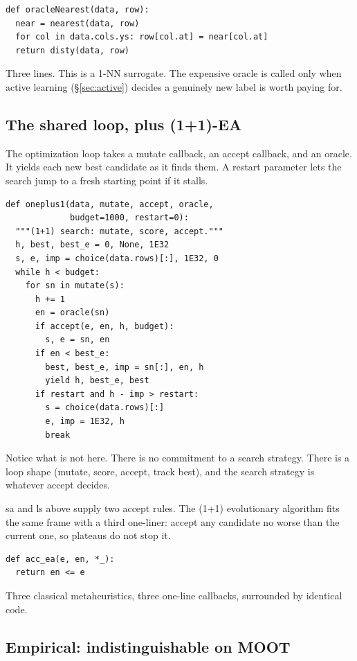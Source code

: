 \begin{verbatim}
def oracleNearest(data, row): 
  near = nearest(data, row)
  for col in data.cols.ys: row[col.at] = near[col.at]
  return disty(data, row)
\end{verbatim}

Three lines. This is a 1-NN surrogate. The expensive oracle is called
only when active learning (\S\ref{sec:active}) decides a genuinely
new label is worth paying for.

\subsection{The shared loop, plus (1+1)-EA}

The optimization loop takes a mutate callback, an accept callback,
and an oracle. It yields each new best candidate as it finds them. A
\textsf{restart} parameter lets the search jump to a fresh starting
point if it stalls.

\begin{verbatim}
def oneplus1(data, mutate, accept, oracle,
             budget=1000, restart=0):
  """(1+1) search: mutate, score, accept."""
  h, best, best_e = 0, None, 1E32
  s, e, imp = choice(data.rows)[:], 1E32, 0
  while h < budget:
    for sn in mutate(s):
      h += 1
      en = oracle(sn)
      if accept(e, en, h, budget):
        s, e = sn, en
      if en < best_e:
        best, best_e, imp = sn[:], en, h
        yield h, best_e, best
      if restart and h - imp > restart:
        s = choice(data.rows)[:]
        e, imp = 1E32, h
        break
\end{verbatim}

Notice what is not here. There is no commitment to a search strategy.
There is a loop shape (mutate, score, accept, track best), and the
search strategy is whatever \textsf{accept} decides.

\textsf{sa} and \textsf{ls} above supply two accept rules. The
(1+1) evolutionary algorithm fits the same frame with a third
one-liner: accept any candidate no worse than the current one, so
plateaus do not stop it.

\begin{verbatim}
def acc_ea(e, en, *_):
  return en <= e
\end{verbatim}

Three classical metaheuristics, three one-line callbacks, surrounded
by identical code.

\subsection{Empirical: indistinguishable on MOOT}

